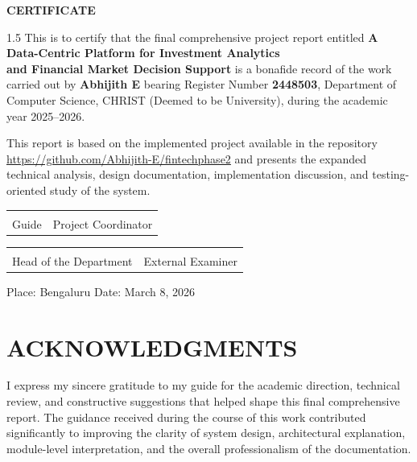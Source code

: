\documentclass[12pt,a4paper]{report}
\newcommand{\projecttitle}{A Data-Centric Platform for Investment Analytics\\and Financial Market Decision Support}
\newcommand{\studentname}{Abhijith E}
\newcommand{\regno}{2448503}
\newcommand{\reportdate}{March 8, 2026}
\newcommand{\repolink}{https://github.com/Abhijith-E/fintechphase2}
\begin{document}
\begin{titlepage}
\thispagestyle{empty}
\centering
\vspace*{0.7in}
{\fontsize{16}{18}\selectfont\bfseries CERTIFICATE\par}
\vspace{0.5in}
\begin{spacing}{1.5}
\noindent This is to certify that the final comprehensive project report entitled \textbf{\projecttitle} is a bonafide record of the work carried out by \textbf{\studentname} bearing Register Number \textbf{\regno}, Department of Computer Science, CHRIST (Deemed to be University), during the academic year 2025--2026.

\vspace{0.22in}
\noindent This report is based on the implemented project available in the repository \url{\repolink} and presents the expanded technical analysis, design documentation, implementation discussion, and testing-oriented study of the system.
\end{spacing}

\vspace{1.55in}
\begin{tabular}{p{2.4in} p{2.4in}}
\centering\hrulefill & \centering\hrulefill \tabularnewline
\centering Guide & \centering Project Coordinator \tabularnewline
\end{tabular}

\vspace{1.05in}
\begin{tabular}{p{2.4in} p{2.4in}}
\centering\hrulefill & \centering\hrulefill \tabularnewline
\centering Head of the Department & \centering External Examiner \tabularnewline
\end{tabular}

\vfill
\noindent Place: Bengaluru \hfill Date: \reportdate
\end{titlepage}

\setcounter{page}{3}
\pagestyle{reportstyle}

\chapter*{ACKNOWLEDGMENTS}
I express my sincere gratitude to my guide for the academic direction, technical review, and constructive suggestions that helped shape this final comprehensive report. The guidance received during the course of this work contributed significantly to improving the clarity of system design, architectural explanation, module-level interpretation, and the overall professionalism of the documentation.
\end{document}
